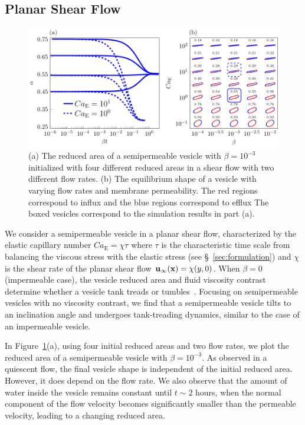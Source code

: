 \documentclass[prb,preprint,showpacs,preprintnumbers,amsmath,amssymb,longbibliography]{revtex4-1}
\newif\ifTikz
\begin{document}
\subsection{Planar Shear Flow}
\begin{figure}[htp]
  \centering
  \ifTikz
  
  \else
  \includegraphics{figures/shearComposite.pdf}
  \fi
  \caption{\label{fig:shearComposite} (a) The reduced area of a
  semipermeable vesicle with $\beta = 10^{-3}$ initialized with four
  different reduced areas in a shear flow with two different flow rates.
  (b) The equilibrium shape of a vesicle with varying flow rates and
  membrane permeability. The red regions correspond to influx and the
  blue regions correspond to efflux The boxed vesicles correspond to the
  simulation results in part (a).}
\end{figure}

We consider a semipermeable vesicle in a planar shear flow,
characterized by the elastic capillary number $Ca_\mathrm{E}=\chi\tau$ where $\tau$ is the characteristic time scale from balancing the viscous stress with the elastic stress
(see \S~\ref{sec:formulation}) and $\chi$ is the shear rate of the
planar shear flow $\mathbf{u}_{\infty}(\mathbf{x}) = \chi (y,0)$.  When $\beta=0$
(impermeable case), the vesicle reduced area and fluid viscosity
contrast determine whether a vesicle tank treads or
tumbles~\cite{fin-lam-sei-gom2008, kra-win-sei-lip1996}. Focusing on
semipermeable vesicles with no viscosity contrast, we find that a
semipermeable vesicle tilts to an inclination angle and undergoes
tank-treading dynamics, similar to the case of an impermeable vesicle.

In Figure~\ref{fig:shearComposite}(a), using four initial reduced areas
and two flow rates, we plot the reduced area of a semipermeable vesicle
with $\beta = 10^{-3}$. As observed in a quiescent flow, the final
vesicle shape is independent of the initial reduced area. However, it
does depend on the flow rate. We also observe that the amount of water
inside the vesicle remains constant until $t\sim 2$ hours, when the
normal component of the flow velocity becomes significantly smaller than
the permeable velocity, leading to a changing reduced area.
\end{document}
